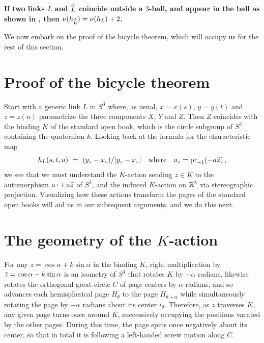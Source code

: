 \begin{corollary}\label{cor:double}
\textbf{\boldmath 
If two links $L$ and $\widehat{L}$ coincide outside a $3$-ball, and appear in the ball as shown in ,  then $\nu(h_{\widehat{L}}) = \nu(h_L) + 2$.}
\end{corollary}





We now embark on the proof of the bicycle theorem, which will occupy us for the rest of this section.  

\part{Proof of the bicycle theorem}

Start with a generic link $L$ in $S^3$ where, as usual, $x=x(s)$, $y=y(t)$ and $z=z(u)$ parametrize the three components $X$, $Y$ and $Z$.   Then $Z$ coincides with the binding $K$ of the standard open book, which is the circle subgroup of $S^3$ containing the quaternion $k$.  Looking back at the formula for the characteristic map 
$$
h_L(s,t,u) \ = \ (y_z-x_z)/|y_z-x_z| \quad\text{where}\quad a_z = \mathrm{pr}_{-1}(-a\bar z)\,,
$$
we see that we must understand the $K$-action sending $z\in K$ to the automorphism $a\mapsto a\bar z$ of $S^3$, and the induced $K$-action on $\mathbb R^3$ via stereographic projection.  Visualizing how these actions transform the pages of the standard open books will aid us in our subsequent arguments, and we do this next. 



\part{The geometry of the $K$-action}


For any $z =  \cos\alpha + k\sin\alpha$ in the binding $K$,
right multiplication by $\bar z =  \cos\alpha -k\sin\alpha$ is an isometry of $S^3$ that rotates $K$ by $-\alpha$ radians, likewise rotates the orthogonal great circle $C$ of page centers by $\alpha$ radians, and so advances each hemispherical page $H_\theta$ to the page $H_{\theta+\alpha}$ while simultaneously rotating the page by $-\alpha$ radians about its center $i_\theta$.  Therefore, as $z$ traverses $K$, any given page turns once around $K$, successively occupying the positions vacated by the other pages.  During this time, the page spins once negatively about its center, so that in total it is following a left-handed screw motion along $C$.   

